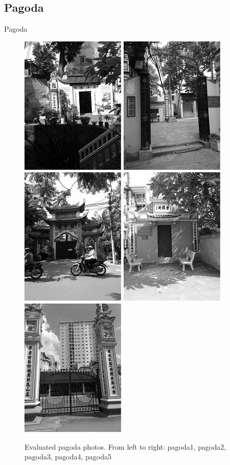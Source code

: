 \documentclass{beamer}
\begin{document}
\subsection{Pagoda}
\begin{frame}{Pagoda}
\begin{figure}[h]
	\centering
	\includegraphics[width=0.18\columnwidth]{images/pagoda1.jpg}
	\includegraphics[width=0.18\columnwidth]{images/pagoda2.jpg}
	\includegraphics[width=0.18\columnwidth]{images/pagoda3.jpg}
	\includegraphics[width=0.18\columnwidth]{images/pagoda4.jpg}
	\includegraphics[width=0.18\columnwidth]{images/pagoda5.jpg}
	\caption{Evaluated pagoda photos. From left to right: pagoda1, pagoda2, pagoda3, pagoda4, pagoda5}
	\label{fig:pagoda}
\end{figure}
\end{frame}
\end{document}
